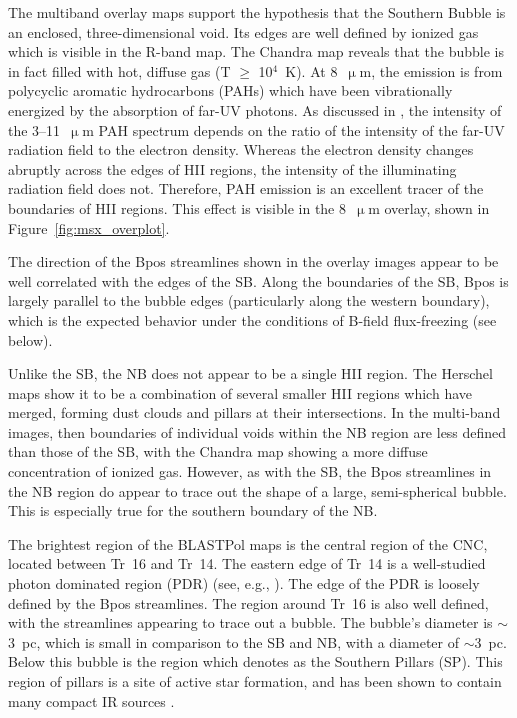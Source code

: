 The multiband overlay maps support the hypothesis that the Southern Bubble is an enclosed, three-dimensional void. Its edges are well defined by ionized gas which is visible in the R-band map. The Chandra map reveals that the bubble is in fact filled with hot, diffuse gas (T $\geq$ 10$^{4}$~K). At 8~$\upmu$m, the emission is from polycyclic aromatic hydrocarbons (PAHs) which have been vibrationally energized by the absorption of far-UV photons. As discussed in \citet{li2006results}, the intensity of the 3--11~$\upmu$m PAH spectrum depends on the ratio of the intensity of the far-UV radiation field to the electron density. Whereas the electron density changes abruptly across the edges of HII regions, the intensity of the illuminating radiation field does not. Therefore, PAH emission is an excellent tracer of the boundaries of HII regions. This effect is visible in the 8~$\upmu$m overlay, shown in Figure~\ref{fig:msx_overplot}.

The direction of the \gls{Bpos} streamlines shown in the overlay images appear to be well correlated with the edges of the SB\@. Along the boundaries of the SB, \gls{Bpos} is largely parallel to the bubble edges (particularly along the western boundary), which is the expected behavior under the conditions of B-field flux-freezing \citep{li2006results} (see below).

Unlike the SB, the NB does not appear to be a single HII region. The Herschel maps show it to be a combination of several smaller HII regions which have merged, forming dust clouds and pillars at their intersections. In the multi-band images, then boundaries of individual voids within the NB region are less defined than those of the SB, with the Chandra map showing a more diffuse concentration of ionized gas. However, as with the SB, the \gls{Bpos} streamlines in the NB region do appear to trace out the shape of a large, semi-spherical bubble. This is especially true for the southern boundary of the NB\@.

The brightest region of the BLASTPol maps is the central region of the CNC, located between Tr~16 and Tr~14. The eastern edge of Tr~14 is a well-studied photon dominated region (PDR) (see, e.g., \citet{kramer2008clumpy}). The edge of the PDR is loosely defined by the \gls{Bpos} streamlines. The region around Tr~16 is also well defined, with the streamlines appearing to trace out a bubble. The bubble's diameter is $\sim$3~pc, which is small in comparison to the SB and NB, with a diameter of $\sim$3~pc. Below this bubble is the region which \citet{preibisch2012herschel} denotes as the Southern Pillars (SP). This region of pillars is a site of active star formation, and has been shown to contain many compact IR sources \citep{smith2010spitzer}.

